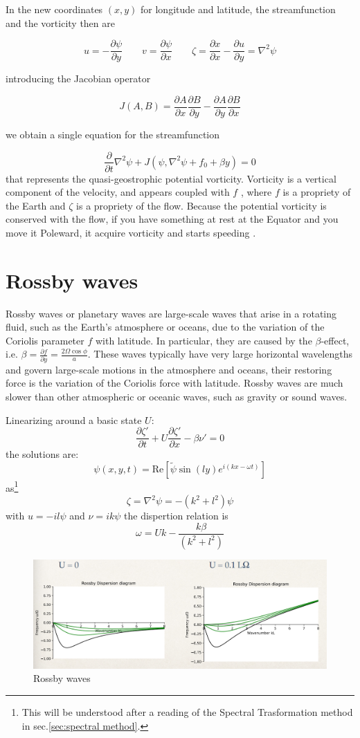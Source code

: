 In the new coordinates \((x,y)\) for longitude and latitude, the
streamfunction and the vorticity then are

\[u=-\frac{\partial \psi}{\partial y}\qquad v=\frac{\partial \psi}{\partial x} \qquad
	\zeta = \frac{\partial x}{\partial x} -\frac{\partial u}{\partial y}=\nabla^2\psi\]

introducing the Jacobian operator

\[J(A,B) = \frac{\partial A}{\partial x}\frac{\partial B}{\partial y} - \frac{\partial A}{\partial y}\frac{\partial B}{\partial x}\]

we obtain a single equation for the streamfunction

\[\frac{\partial }{\partial t}\nabla^2\psi  + J(\psi, \nabla^2\psi +f_0 + \beta y) = 0\]
that represents the quasi-geostrophic potential vorticity.
Vorticity is a vertical component of the velocity, and appears coupled with $f$ , where $f$ is a propriety of the Earth and $\zeta$  is a propriety of the flow. Because the potential vorticity is conserved with the flow, if you have something at rest at the Equator and you move it Poleward, it acquire vorticity and starts speeding .


\section{Rossby waves}
Rossby waves or planetary waves are large-scale waves that arise in a rotating fluid, such as the Earth's atmosphere or oceans, due to the variation of the Coriolis parameter $f$ with latitude. In particular, they are caused by the $\beta$-effect, i.e. $\beta=\frac{\partial f}{\partial y}=\frac{2\Omega\cos\phi}{a}$. These waves typically have very large horizontal wavelengths and govern large-scale motions in the atmosphere and oceans, their restoring force is the variation of the Coriolis force with latitude. Rossby waves are much slower than other atmospheric or oceanic waves, such as gravity or sound waves.

Linearizing around a basic state $U$:
\begin{equation}
	\frac{\partial\zeta'}{\partial t}+U\frac{\partial\zeta'}{\partial x}-\beta\nu'=0
\end{equation}
the solutions are:
\begin{equation}
	\psi(x,y,t)=\text{Re}\left[\tilde{\psi}\sin(ly)e^{i(kx-\omega t)}\right]
\end{equation}
as\footnote{This will be understood after a reading of the Spectral Trasformation method in sec.\ref{sec:spectral method}.} $$\zeta=\nabla^2\psi=-(k^2+l^2)\psi$$
with $u=-il\psi$ and $\nu=ik\psi$
the dispertion relation is $$\omega=Uk-\frac{k\beta}{(k^2+l^2)}$$
\begin{figure}[htpb]
	\centering
	\includegraphics[width=0.5\linewidth]{uploads/Screenshot 2024-11-21 162828.png}
	\caption{Rossby waves}
	\label{fig:enter-label}
\end{figure}

